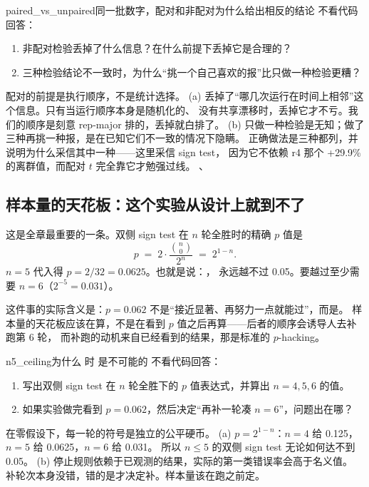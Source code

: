\begin{checkpoint}{paired_vs_unpaired}{同一批数字，配对和非配对为什么给出相反的结论}
不看代码回答：
\begin{enumerate}[label=(\alph*)]
  \item 非配对检验丢掉了什么信息？在什么前提下丢掉它是合理的？
  \item 三种检验结论不一致时，为什么“挑一个自己喜欢的报”比只做一种检验更糟？
\end{enumerate}
\hint 配对的前提是执行顺序，不是统计选择。
\ifshowanswers
\tcblower
\answer (a) 丢掉了“哪几次运行在时间上相邻”这个信息。只有当运行顺序本身是随机化的、
没有共享漂移时，丢掉它才不亏。我们的顺序是刻意 rep-major 排的，丢掉就白排了。
(b) 只做一种检验是无知；做了三种再挑一种报，是在已知它们不一致的情况下隐瞒。
正确做法是三种都列，并说明为什么采信其中一种——这里采信 sign test，
因为它不依赖 r4 那个 +29.9\% 的离群值，而配对 $t$ 完全靠它才勉强过线。
\whereincode {}、
\fi
\end{checkpoint}

\subsection{样本量的天花板：这个实验从设计上就到不了 }
\label{subsec:n5}

这是全章最重要的一条。双侧 sign test 在 $n$ 轮全胜时的精确 $p$ 值是
\[
p \;=\; 2\cdot\frac{{n \choose 0}}{2^{n}} \;=\; 2^{1-n}.
\]
$n=5$ 代入得 $p = 2/32 = 0.0625$。也就是说：，
永远越不过 0.05。要越过至少需要 $n=6$（$2^{-5}=0.031$）。

这件事的实际含义是：$p=0.062$ 不是“接近显著、再努力一点就能过”，而是。
样本量的天花板应该在算，不是在看到 $p$ 值之后再算——后者的顺序会诱导人去补跑第 6 轮，
而补跑的动机来自已经看到的结果，那是标准的 $p$-hacking。

\begin{checkpoint}{n5_ceiling}{为什么  时  是不可能的}
不看代码回答：
\begin{enumerate}[label=(\alph*)]
  \item 写出双侧 sign test 在 $n$ 轮全胜下的 $p$ 值表达式，并算出 $n=4,5,6$ 的值。
  \item 如果实验做完看到 $p=0.062$，然后决定“再补一轮凑 $n=6$”，问题出在哪？
\end{enumerate}
\hint 在零假设下，每一轮的符号是独立的公平硬币。
\ifshowanswers
\tcblower
\answer (a) $p = 2^{1-n}$：$n=4$ 给 0.125，$n=5$ 给 0.0625，$n=6$ 给 0.031。
所以 $n\le5$ 的双侧 sign test 无论如何达不到 0.05。
(b) 停止规则依赖于已观测的结果，实际的第一类错误率会高于名义值。
补轮次本身没错，错的是才决定补。样本量该在跑之前定。
\whereincode {}
\fi
\end{checkpoint}

